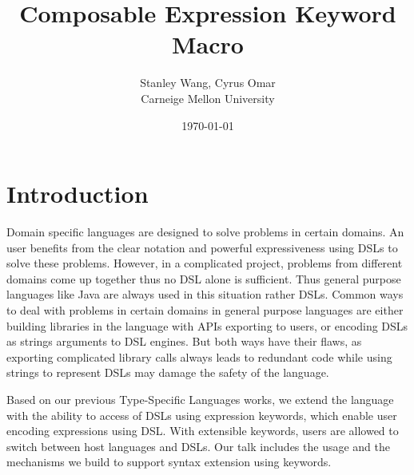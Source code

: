 \documentclass[letterpaper, notitlepage]{article}
\begin{document}
\title{Composable Expression Keyword Macro}
\author{Stanley Wang, Cyrus Omar\\
Carneige Mellon University}
\date{\today}
\maketitle

\section{Introduction}
Domain specific languages are designed to solve problems in certain domains. An user benefits from the clear notation and powerful expressiveness using DSLs to solve these problems. However, in a complicated project, problems from different domains come up together thus no DSL alone is sufficient. Thus general purpose languages like Java are always used in this situation rather DSLs. Common ways to deal with problems in certain domains in general purpose languages are either building libraries in the language with APIs exporting to users, or encoding DSLs as strings arguments to DSL engines. But both ways have their flaws, as exporting complicated library calls always leads to redundant code while using strings to represent DSLs may damage the safety of the language.
\par
Based on our previous Type-Specific Languages works, we extend the language with the ability to access of DSLs using expression keywords, which enable user encoding expressions using DSL. With extensible keywords, users are allowed to switch between host languages and DSLs. Our talk includes the usage and the mechanisms we build to support syntax extension using keywords.
\end{document}
